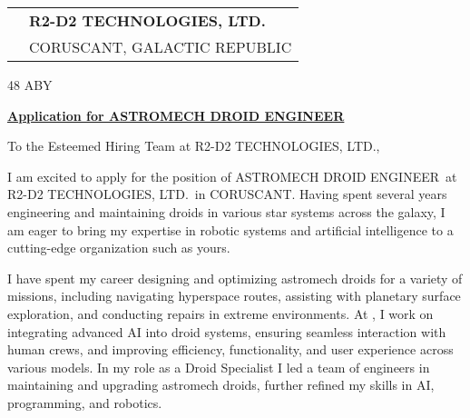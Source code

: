 \documentclass[10pt, a4paper]{article}
\begin{document}
\vspace{3cm}
\bigskip
\bigskip

\newcommand{\COMPANY}{R2-D2 TECHNOLOGIES, LTD.}
\newcommand{\ROLE}{ASTROMECH DROID ENGINEER}
\newcommand{\JobPostingURL}{https://www.esa.int/About_Us/Careers_at_ESA/Apply_now_to_become_an_ESA_astronaut}
\newcommand{\CITY}{CORUSCANT}
\newcommand{\COUNTRY}{GALACTIC REPUBLIC}

\begin{tabular}{@{}p{0cm}l@{}} 
 & \textbf{\COMPANY} \\[0.8ex] 
 & \CITY, \COUNTRY
\end{tabular}

\bigskip %

\hfill 48 ABY

\noindent \textbf{\underline{Application for \href{\JobPostingURL}{\ROLE}}}

To the Esteemed Hiring Team at \COMPANY,

\bigskip

I am excited to apply for the position of \ROLE\ at \COMPANY\ in \CITY. Having spent several years engineering and maintaining droids in various star systems across the galaxy, I am eager to bring my expertise in robotic systems and artificial intelligence to a cutting-edge organization such as yours.

I have spent my career designing and optimizing astromech droids for a variety of missions, including navigating hyperspace routes, assisting with planetary surface exploration, and conducting repairs in extreme environments. At \currentEmployer, I work on integrating advanced AI into droid systems, ensuring seamless interaction with human crews, and improving efficiency, functionality, and user experience across various models. In my role as a Droid Specialist I led a team of engineers in maintaining and upgrading astromech droids, further refined my skills in AI, programming, and robotics.
\end{document}
